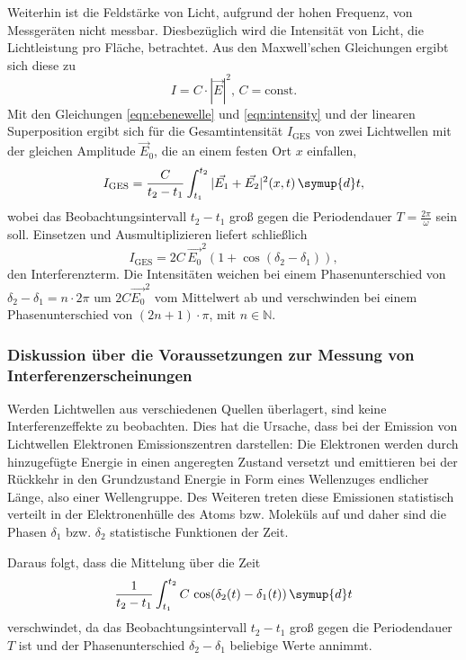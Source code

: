 Weiterhin ist die Feldstärke von Licht, aufgrund der hohen Frequenz, von
Messgeräten nicht messbar. Diesbezüglich wird die Intensität von Licht, die Lichtleistung pro 
Fläche, betrachtet.
Aus den Maxwell'schen Gleichungen ergibt sich diese zu
\begin{equation}
	\label{eqn:intensity}
	I = C \cdot |\vec{E}|^2 \mathrm{, } \, C = \mathrm{const.}
\end{equation}
Mit den Gleichungen \eqref{eqn:ebenewelle} und \eqref{eqn:intensity} und der linearen 
Superposition ergibt sich für die Gesamtintensität $I_{\mathrm{GES}}$ von zwei Lichtwellen mit 
der gleichen Amplitude $\vec{E}_0$, die an einem festen Ort $x$ einfallen,
\begin{equation}
	I_{\mathrm{GES}} = \frac{C}{t_2 - t_1} \int_{t_1}^{t_2} |\vec{E_1} + \vec{E_2}|^2(x,t) \,  \symup{d}t \mathrm{,}
\end{equation}
wobei das Beobachtungsintervall $t_2 - t_1$ groß gegen die Periodendauer $T=\frac{2\pi}{\omega}$
sein soll.
Einsetzen und Ausmultiplizieren liefert schließlich
\begin{equation}
	I_{\mathrm{GES}} = 2C \, \vec{E_0}^2 (1+\cos(\delta_2 - \delta_1)) \mathrm{,}
\end{equation}
den Interferenzterm. Die Intensitäten weichen bei einem Phasenunterschied von
$\delta_2 - \delta_1 = n \cdot 2\pi$ um $2C \vec{E_0}^2$ vom Mittelwert ab und verschwinden
bei einem Phasenunterschied von $(2n+1) \cdot \pi$, mit $n \in \mathbb{N}$.


\subsubsection{Diskussion über die Voraussetzungen zur Messung von Interferenzerscheinungen}
\label{sec:messunginterferenz}

Werden Lichtwellen aus verschiedenen Quellen überlagert, sind keine Interferenzeffekte zu 
beobachten. Dies hat die Ursache, dass bei der Emission von Lichtwellen Elektronen 
Emissionszentren darstellen: Die Elektronen werden durch hinzugefügte Energie in einen 
angeregten Zustand versetzt und emittieren bei der Rückkehr in den Grundzustand Energie in Form 
eines Wellenzuges endlicher Länge, also einer Wellengruppe. Des Weiteren treten diese Emissionen 
statistisch verteilt in der Elektronenhülle des Atoms bzw. Moleküls auf und daher sind die Phasen
$\delta_1$ bzw. $\delta_2$ statistische Funktionen der Zeit. 

Daraus folgt, dass die Mittelung über die Zeit
\begin{equation}
	\frac{1}{t_2-t_1} \int_{t_1}^{t_2} C \, \cos(\delta_2(t)-\delta_1(t)) \, \symup{d}t
\end{equation}
verschwindet, da das Beobachtungsintervall $t_2-t_1$ groß gegen die Periodendauer $T$ ist und 
der Phasenunterschied $\delta_2-\delta_1$ beliebige Werte annimmt.


